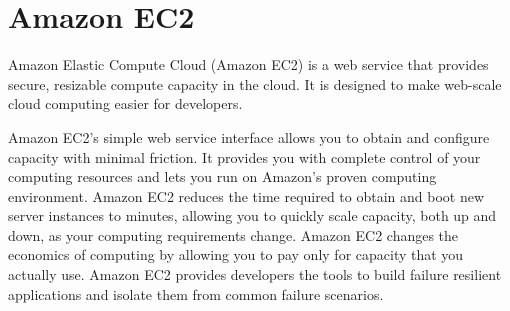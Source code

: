 \section{Amazon EC2}
Amazon Elastic Compute Cloud (Amazon EC2)\cite{www-amazonec2} is a web service that provides
secure, resizable compute capacity in the cloud. It is designed to make
web-scale cloud computing easier for developers.

Amazon EC2’s simple web service interface allows you to obtain and configure
capacity with minimal friction. It provides you with complete control of your
computing resources and lets you run on Amazon’s proven computing environment.
Amazon EC2 reduces the time required to obtain and boot new server instances
to minutes, allowing you to quickly scale capacity, both up and down, as your
computing requirements change. Amazon EC2 changes the economics of computing
by allowing you to pay only for capacity that you actually use. Amazon EC2
provides developers the tools to build failure resilient applications and
isolate them from common failure scenarios.
